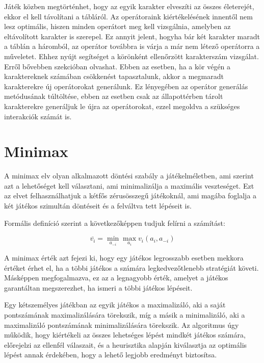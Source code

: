 \documentclass[
]{thesis-ekf}
\theoremstyle{definition}
\theoremstyle{remark}
\begin{document}
Játék közben megtörténhet, hogy az egyik karakter elveszíti az összes életerejét, ekkor el kell távolítani a tábláról. Az operátoraink kiértékelésének innentől nem lesz optimális, hiszen minden operátort meg kell vizsgálnia, amelyben az eltávolított karakter is szerepel. Ez annyit jelent, hogyha bár két karakter maradt a táblán a háromból, az operátor továbbra is várja a már nem létező operátorra a műveletet. Ehhez nyújt segítséget a körönként ellenőrzött karakterszám vizsgálat. Erről bővebben  szekcióban olvashat. Ebben az esetben, ha a kör végén a karaktereknek számában csökkenést tapasztalunk, akkor a megmaradt karakterekre új operátorokat generálunk. Ez lényegében az operátor generálás metódusának túltöltése, ebben az esetben csak az állapottérben tárolt karakterekre generáljuk le újra az operátorokat, ezzel megoldva a szükséges interakciók számát is.



\section{Minimax} \label{minimax}

A minimax elv olyan alkalmazott döntési szabály a játékelméletben, ami szerint azt a lehetőséget kell választani, ami minimalizálja a maximális veszteséget. Ezt az elvet felhasználhatjuk a kétfős zérusösszegű játékoknál, ami magába foglalja a két játékos szimultán döntéseit és a felváltva tett lépéseit is. \cite{MiniMaxEnWiki}

Formális definíció szerint a következőképpen tudjuk felírni a számítást: \cite{MiniMaxEnWiki}

\begin{equation*}
	\overline{v_{i}}=\underset{{a_{-i}}}{\min} \underset{{a_{i}}}{\max} v_{i}(a_{i}, a_{-i})
\end{equation*}

A minimax érték azt fejezi ki, hogy egy játékos legrosszabb esetben mekkora értéket érhet el, ha a többi játékos a számára legkedvezőtlenebb stratégiát követi. Másképpen megfogalmazva, ez az a legnagyobb érték, amelyet a játékos garantáltan megszerezhet, ha ismeri a többi játékos lépéseit. 

Egy kétszemélyes játékban az egyik játékos a maximalizáló, aki a saját pontszámának maximalizálására törekszik, míg a másik a minimalizáló, aki a maximalizáló pontszámának minimalizálására törekszik. Az algoritmus úgy működik, hogy kiértékeli az összes lehetséges lépést mindkét játékos számára, előrejelzi az ellenfél válaszait, és a heurisztika alapján kiválasztja az optimális lépést annak érdekében, hogy a lehető legjobb eredményt biztosítsa. \cite{MiniMaxGfG}
\end{document}
